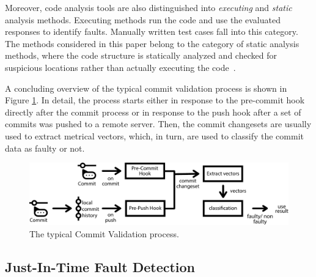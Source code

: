 Moreover, code analysis tools are also distinguished into \textit{executing} and \textit{static} analysis methods. Executing methods run the code and use the evaluated responses to identify faults. Manually written test cases fall into this category. The methods considered in this paper belong to the category of static analysis methods, where the code structure is statically analyzed and checked for suspicious locations rather than actually executing the code~\cite{Wichmann1995}.

A concluding overview of the typical commit validation process is shown in Figure \ref{fig:cvprocess}. In detail, the process starts either in response to the pre-commit hook directly after the commit process or in response to the push hook after a set of commits was pushed to a remote server. Then, the commit changesets are usually used to extract metrical vectors, which, in turn, are used to classify the commit data as faulty or not.

\begin{figure}[t]
	\centering
	\includegraphics[width=\textwidth]{images/commitvalidation-process/typicalprocess-pdf}
	\caption{The typical Commit Validation process.}
	\label{fig:cvprocess}
\end{figure}

\subsection{Just-In-Time Fault Detection}

